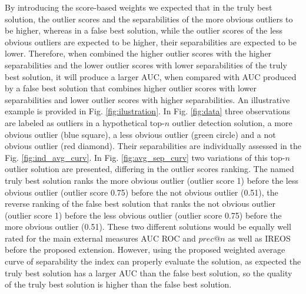 By introducing the score-based weights we expected that in the truly best solution, the outlier scores and the separabilities of the more obvious outliers to be higher, whereas in a false best solution, while the outlier scores of the less obvious outliers are expected to be higher, their separabilities are expected to be lower. Therefore, when combined the higher outlier scores with the higher separabilities and the lower outlier scores with lower separabilities of the truly best solution, it will produce a larger AUC, when compared with AUC produced by a false best solution that combines higher outlier scores with lower separabilities and lower outlier scores with higher separabilities. An illustrative example is provided in Fig. \ref{fig:ilustration}. In Fig. \ref{fig:data} three observations are labeled as outliers in a hypothetical top-$n$ outlier detection solution, a more obvious outlier (blue square), a less obvious outlier (green circle) and a not obvious outlier (red diamond). Their separabilities are individually assessed in the Fig. \ref{fig:ind_avg_curv}. In Fig. \ref{fig:avg_sep_curv} two variations of this top-$n$ outlier solution are presented, differing in the outlier scores ranking. The named truly best solution ranks the more obvious outlier (outlier score 1) before the less obvious outlier (outlier score 0.75) before the not obvious outlier (0.51), the reverse ranking of the false best solution that ranks the not obvious outlier (outlier score 1) before the less obvious outlier (outlier score 0.75) before the more obvious outlier (0.51). These two different solutions would be equally well rated for the main external measures AUC ROC and $prec@n$ as well as IREOS before the proposed extension. However, using the proposed weighted average curve of separability the index can properly evaluate the solution, as expected the truly best solution has a larger AUC than the false best solution, so the quality of the truly best solution is higher than the false best solution.

